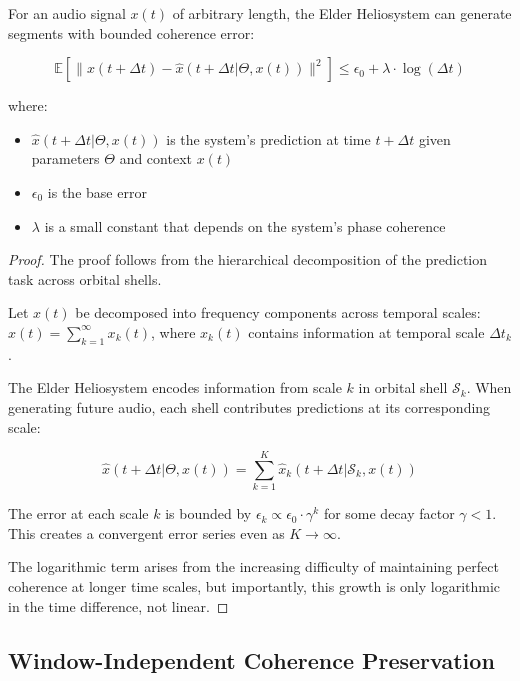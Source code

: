 \begin{theorem}
For an audio signal $x(t)$ of arbitrary length, the Elder Heliosystem can generate segments with bounded coherence error:

\begin{equation}
\mathbb{E}[\|x(t+\Delta t) - \hat{x}(t+\Delta t|\Theta, x(t))\|^2] \leq \epsilon_0 + \lambda \cdot \log(\Delta t)
\end{equation}

where:
\begin{itemize}
    \item $\hat{x}(t+\Delta t|\Theta, x(t))$ is the system's prediction at time $t+\Delta t$ given parameters $\Theta$ and context $x(t)$
    \item $\epsilon_0$ is the base error
    \item $\lambda$ is a small constant that depends on the system's phase coherence
\end{itemize}
\end{theorem}

\begin{proof}
The proof follows from the hierarchical decomposition of the prediction task across orbital shells.

Let $x(t)$ be decomposed into frequency components across temporal scales: $x(t) = \sum_{k=1}^{\infty} x_k(t)$, where $x_k(t)$ contains information at temporal scale $\Delta t_k$.

The Elder Heliosystem encodes information from scale $k$ in orbital shell $\mathcal{S}_k$. When generating future audio, each shell contributes predictions at its corresponding scale:

\begin{equation}
\hat{x}(t+\Delta t|\Theta, x(t)) = \sum_{k=1}^K \hat{x}_k(t+\Delta t|\mathcal{S}_k, x(t))
\end{equation}

The error at each scale $k$ is bounded by $\epsilon_k \propto \epsilon_0 \cdot \gamma^k$ for some decay factor $\gamma < 1$. This creates a convergent error series even as $K \rightarrow \infty$.

The logarithmic term arises from the increasing difficulty of maintaining perfect coherence at longer time scales, but importantly, this growth is only logarithmic in the time difference, not linear.
\end{proof}

\subsection{Window-Independent Coherence Preservation}

